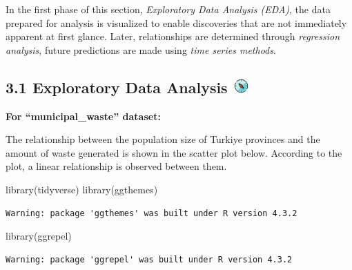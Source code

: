 \documentclass[
  11pt,
  a4paper,
  DIV=11,
  numbers=noendperiod]{scrartcl}
\newenvironment{Shaded}{\begin{snugshade}}{\end{snugshade}}
\newcommand{\FunctionTok}[1]{\textcolor[rgb]{0.28,0.35,0.67}{#1}}
\newcommand{\NormalTok}[1]{\textcolor[rgb]{0.00,0.23,0.31}{#1}}
\begin{document}
In the first phase of this section, \emph{Exploratory Data Analysis
(EDA)}, the data prepared for analysis is visualized to enable
discoveries that are not immediately apparent at first glance. Later,
relationships are determined through \emph{regression analysis}, future
predictions are made using \emph{time series methods}.

\subsection[{3.1 Exploratory Data Analysis} ]{\texorpdfstring{{3.1
Exploratory Data Analysis}
\protect\includegraphics[width=0.23958in,height=0.21875in]{assets/images/EDA.jpg}}{3.1 Exploratory Data Analysis }}\label{exploratory-data-analysis}

{\textbf{For ``municipal\_waste'' dataset:}}

The relationship between the population size of Turkiye provinces and
the amount of waste generated is shown in the scatter plot below.
According to the plot, a linear relationship is observed between them.

\begin{Shaded}
\begin{Highlighting}[]
\FunctionTok{library}\NormalTok{(tidyverse)}
\FunctionTok{library}\NormalTok{(ggthemes)}
\end{Highlighting}
\end{Shaded}

\begin{verbatim}
Warning: package 'ggthemes' was built under R version 4.3.2
\end{verbatim}

\begin{Shaded}
\begin{Highlighting}[]
\FunctionTok{library}\NormalTok{(ggrepel)}
\end{Highlighting}
\end{Shaded}

\begin{verbatim}
Warning: package 'ggrepel' was built under R version 4.3.2
\end{verbatim}
\end{document}
